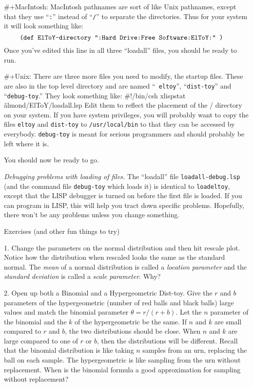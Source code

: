 \#+MacIntosh:  MacIntosh pathnames are sort of like Unix pathnames,
except that they use ``{\tt :}'' instead of ``{\tt /}'' to separate
the directories.  Thus for your system it will look something like:
$$\vbox{
\tt\obeyspaces
(def ElToY-directory ":Hard Drive:Free Software:ElToY:" )
}$$
Once you've edited this line in all three ``loadall'' files, you
should be ready to run.

\#+Unix:  There are three more files you need to modify, the startup
files.  These are also in the top level directory and are named ``{\tt
eltoy\/}'', ``{\tt dist-toy\/}'' and ``{\tt debug-toy\/}.''  They look
something like:
\begincode
\#!/bin/csh
xlispstat \~almond/ElToY/loadall.lsp
\endcode
Edit them to reflect the placement of the \eltoy/ directory on your
system.  If you have system privileges, you will probably want to copy
the files {\tt eltoy\/} and {\tt dist-toy\/} to {\tt /usr/local/bin\/}
to that they can be accessed by everybody.  {\tt debug-toy\/} is meant
for serious programmers and should probably be left where it is.

You should now be ready to go.


{\it Debugging problems with loading of files.\/} The ``loadall'' file
{\tt loadall-debug.lsp\/} (and the command file {\tt debug-toy\/}
which loads it) is identical to {\tt loadeltoy\/}, except that the
LISP debugger is turned on before the first file is loaded.  If you
can program in LISP, this will help you tract down specific problems.
Hopefully, there won't be any problems unless you change something.

 Exercises (and other fun things to try)

\item{1.} Change the parameters on the normal distribution and then
hit rescale plot.  Notice how the distribution when rescaled looks the
same as the standard normal.  The {\it mean\/} of a normal
distribution is called a {\it location parameter\/} and the {\it
standard deviation\/} is called a {\it scale parameter\/}.  Why?

\item{2.} Open up both a Binomial and a Hypergeometric Dist-toy.  Give
the $r$ and $b$ parameters of the hypergeometric (number of red balls
and black balls) large values and match the binomial parameter
$\theta=r/(r+b)$.  Let the $n$ parameter of the binomial and the $k$
of the hypergeometric be the same.  If $n$ and $k$ are small compared
to $r$ and $b$, the two distributions should be close.  When $n$ and $k$ are
large compared to one of $r$ or $b$, then the distributions will be
different.  Recall that the binomial distribution is like taking $n$
samples from an urn, replacing the ball on each sample.  The
hypergeometric is like sampling from the urn without replacement.
When is the binomial formula a good approximation for sampling without
replacement?

